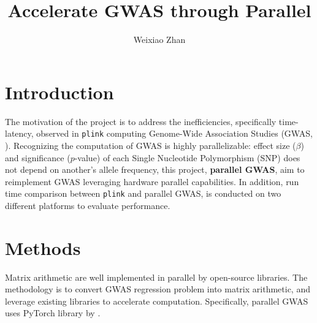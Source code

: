 \documentclass{article}
\title{Accelerate GWAS through Parallel}
\author{Weixiao Zhan}
\begin{document}
\maketitle

\section{Introduction}

The motivation of the project is to address the inefficiencies,
specifically time-latency,
observed in \texttt{plink} computing Genome-Wide Association Studies (GWAS, \cite{uffelmann2021genome}).
Recognizing the computation of GWAS is highly 
parallelizable: effect size ($\beta$) and significance ($p$-value) 
of each Single Nucleotide Polymorphism (SNP) does not depend on 
another's allele frequency,
this project, \textbf{parallel GWAS}, aim to reimplement GWAS 
leveraging hardware parallel capabilities.
In addition, run time comparison between \texttt{plink} and parallel GWAS,
is conducted on two different platforms to evaluate performance.

\section{Methods}
Matrix arithmetic are well implemented in parallel by open-source libraries.
The methodology is to convert GWAS regression problem into matrix arithmetic,
and leverage existing libraries to accelerate computation.
Specifically, parallel GWAS uses PyTorch library by \cite{paszke2019pytorch}.
\end{document}

